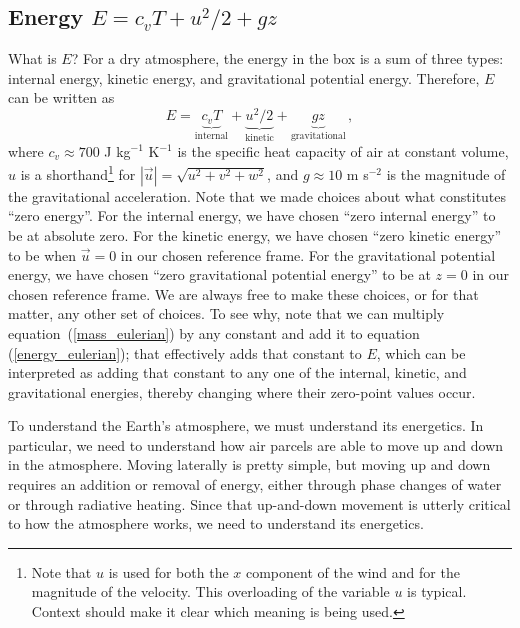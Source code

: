 \documentclass[12pt]{article}
\begin{document}
\subsection{Energy $E = c_vT + u^2/2 + gz$}


What is $E$?  For a dry atmosphere, the energy in the box is a sum of three types: internal energy, kinetic energy, and gravitational potential energy.  Therefore, $E$ can be written as
\begin{equation}
E = \underbrace{c_v T}_{\text{internal}} + \underbrace{u^2/2}_{\text{kinetic}} + \underbrace{gz}_{\text{gravitational}} \, , \label{Edef}
\end{equation}
where $c_v \approx 700$ J kg$^{-1}$ K$^{-1}$ is the specific heat capacity of air at constant volume, $u$ is a shorthand\footnote{Note that $u$ is used for both the $x$ component of the wind and for the magnitude of the velocity.  This overloading of the variable $u$ is typical.  Context should make it clear which meaning is being used.} for $|\vec{u}| = \sqrt{u^2 + v^2 + w^2}$, and $g \approx 10$ m s$^{-2}$ is the magnitude of the gravitational acceleration.  Note that we made choices about what constitutes ``zero energy''.  For the internal energy, we have chosen ``zero internal energy'' to be at absolute zero.  For the kinetic energy, we have chosen ``zero kinetic energy'' to be when $\vec{u} = 0$ in our chosen reference frame.  For the gravitational potential energy, we have chosen ``zero gravitational potential energy'' to be at $z=0$ in our chosen reference frame.  We are always free to make these choices, or for that matter, any other set of choices.  To see why, note that we can multiply equation~(\ref{mass_eulerian}) by any constant and add it to equation (\ref{energy_eulerian}); that effectively adds that constant to $E$, which can be interpreted as adding that constant to any one of the internal, kinetic, and gravitational energies, thereby changing where their zero-point values occur.


To understand the Earth's atmosphere, we must understand its energetics.  In particular, we need to understand how air parcels are able to move up and down in the atmosphere.  Moving laterally is pretty simple, but moving up and down requires an addition or removal of energy, either through phase changes of water or through radiative heating.  Since that up-and-down movement is utterly critical to how the atmosphere works, we need to understand its energetics.
\end{document}
